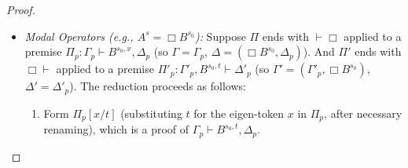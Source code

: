 \documentclass{article}
\newcommand{\seq}[2]{{#1} \vdash{} {#2}}
\newcommand{\pf}[2]{{#1}^{#2}} %
\newcommand{\cana}[1]{#1\!-\!\pf{A}{s}}
\theoremstyle{definition}
\begin{document}
\begin{proof}
\begin{enumerate}
\begin{itemize}
\begin{figure}[t]\small
\emph{The three cross mixes on the parent formula $\pf{A}{s}=\pf{B\to C}{s}$:}
\[
\AxiomC{$\Pi_1$}
\noLine
\UnaryInfC{$\seq{\Gamma_1, \pf{B}{s}}{\pf{C}{s}, \Delta_1}$}
\AxiomC{$\Pi'$}
\noLine
\UnaryInfC{$\seq{\Gamma', \pf{A}{s}}{\Delta'}$}
\RightLabel{Mix $\pf{A}{s}$}
\BinaryInfC{$\Xi_1 : \seq{\Gamma_1, \pf{B}{s}, \cana{\Gamma'}}{\pf{C}{s}, \cana{\Delta_1}, \Delta'}$}
\DisplayProof
\]
\[
\AxiomC{$\Pi$}
\noLine
\UnaryInfC{$\seq{\Gamma_1}{\pf{A}{s}, \Delta_1}$}
\AxiomC{$\Pi'_2$}
\noLine
\UnaryInfC{$\seq{\Gamma'_2, \pf{C}{s}}{\Delta'_2}$}
\RightLabel{Mix $\pf{A}{s}$}
\BinaryInfC{$\Xi_2 : \seq{\Gamma_1, \cana{\Gamma'_2}, \pf{C}{s}}{\cana{\Delta_1}, \Delta'_2}$}
\DisplayProof
\qquad
\AxiomC{$\Pi$}
\noLine
\UnaryInfC{$\seq{\Gamma_1}{\pf{A}{s}, \Delta_1}$}
\AxiomC{$\Pi'_1$}
\noLine
\UnaryInfC{$\seq{\Gamma'_1}{\pf{B}{s}, \Delta'_1}$}
\RightLabel{Mix $\pf{A}{s}$}
\BinaryInfC{$\Xi_3 : \seq{\Gamma_1, \cana{\Gamma'_1}}{\cana{\Delta_1}, \pf{B}{s}, \Delta'_1}$}
\DisplayProof
\]
\emph{The two mixes on the immediate subformulae, at strictly smaller degree:}
\[
\AxiomC{$\Xi_1$}
\AxiomC{$\Xi_2$}
\RightLabel{Mix $\pf{C}{s}$, structural}
\BinaryInfC{$\Upsilon : \seq{\Gamma_1, \pf{B}{s}, \cana{\Gamma'}}{\cana{\Delta_1}, \Delta'}$}
\DisplayProof
\]
\[
\AxiomC{$\Xi_3$}
\AxiomC{$\Upsilon$}
\RightLabel{Mix $\pf{B}{s}$, structural}
\BinaryInfC{$\seq{\Gamma_1, \cana{\Gamma'}}{\cana{\Delta_1}, \Delta'}$}
\DisplayProof
\]
\caption{The principal reduction for $\pf{A}{s}=\pf{B\to C}{s}$: three cross mixes at degree $n$ and decreasing mix height, then two mixes at degree strictly below $n$. The labels ``structural'' stand for the contractions and exchanges that normalise the duplicated and reordered contexts.}\label{fig:imp-reduction}
\end{figure}
            \item \textit{Modal Operators (e.g., $\pf{A}{s} = \pf{\Box B}{s_0}$):}
                Suppose $\Pi$ ends with $\vdash \Box$ applied to a premise $\Pi_p: \seq{\Gamma_p}{\pf{B}{s_0,x}, \Delta_p}$ (so $\Gamma = \Gamma_p$, $\Delta = (\pf{\Box B}{s_0}, \Delta_p)$).
                And $\Pi'$ ends with $\Box \vdash$ applied to a premise $\Pi'_p: \seq{\Gamma'_p, \pf{B}{s_0,t}}{\Delta'_p}$ (so $\Gamma' = (\Gamma'_p, \pf{\Box B}{s_0})$, $\Delta' = \Delta'_p$).
                The reduction proceeds as follows:
                \begin{enumerate}
                    \item Form $\Pi_p[x/t]$ (substituting $t$ for the eigen-token $x$ in $\Pi_p$, after necessary renaming), which is a proof of $\seq{\Gamma_p}{\pf{B}{s_0,t}, \Delta_p}$.

\end{enumerate}
\end{itemize}
\end{enumerate}
\end{proof}
\end{document}
